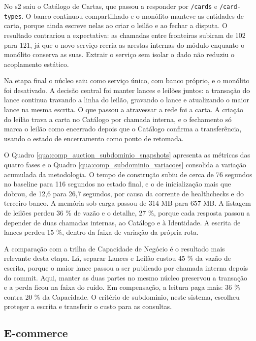 No s2 saiu o Catálogo de Cartas, que passou a responder por \texttt{/cards} e \texttt{/card-types}. O banco continuou compartilhado e o monólito manteve as entidades de carta, porque ainda escreve nelas ao criar o leilão e ao fechar a disputa. O resultado contrariou a expectativa: as chamadas entre fronteiras subiram de 102 para 121, já que o novo serviço recria as arestas internas do módulo enquanto o monólito conserva as suas. Extrair o serviço sem isolar o dado não reduziu o acoplamento estático.

Na etapa final o núcleo saiu como serviço único, com banco próprio, e o monólito foi desativado. A decisão central foi manter lances e leilões juntos: a transação do lance continua travando a linha do leilão, gravando o lance e atualizando o maior lance na mesma escrita. O que passou a atravessar a rede foi a carta. A criação do leilão trava a carta no Catálogo por chamada interna, e o fechamento só marca o leilão como encerrado depois que o Catálogo confirma a transferência, usando o estado de encerramento como ponto de retomada.

O Quadro \ref{qua:comp_auction_subdominio_snapshots} apresenta as métricas das quatro fases e o Quadro \ref{qua:comp_subdominio_variacoes} consolida a variação acumulada da metodologia. O tempo de construção subiu de cerca de 76 segundos no baseline para 116 segundos no estado final, e o de inicialização mais que dobrou, de 12,6 para 26,7 segundos, por causa da corrente de healthchecks e do terceiro banco. A memória sob carga passou de 314 MB para 657 MB. A listagem de leilões perdeu 36 \% de vazão e o detalhe, 27 \%, porque cada resposta passou a depender de duas chamadas internas, ao Catálogo e à Identidade. A escrita de lances perdeu 15 \%, dentro da faixa de variação da própria rota.

A comparação com a trilha de Capacidade de Negócio é o resultado mais relevante desta etapa. Lá, separar Lances e Leilão custou 45 \% da vazão de escrita, porque o maior lance passou a ser publicado por chamada interna depois do commit. Aqui, manter as duas partes no mesmo núcleo preservou a transação e a perda ficou na faixa do ruído. Em compensação, a leitura paga mais: 36 \% contra 20 \% da Capacidade. O critério de subdomínio, neste sistema, escolheu proteger a escrita e transferir o custo para as consultas.



\subsection*{E-commerce}

